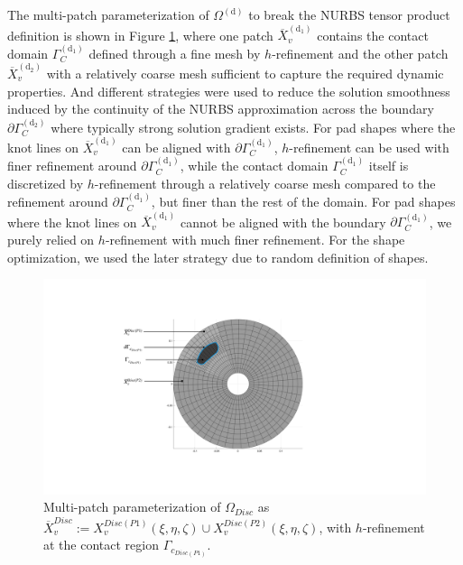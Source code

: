 The multi-patch parameterization of $\Omega^{(\mathrm d)}$ to break the NURBS tensor product definition is shown in Figure \ref{fig:multi-patch_disc}, where one patch  $\overline{X}_{v}^{(\mathrm d_1)}$ contains the contact domain $\Gamma_{C}^{(\mathrm d_1)}$ defined through a fine mesh by $h$-refinement and the other patch $\overline{X}_{v}^{(\mathrm d_2)}$ with a relatively coarse mesh sufficient to capture the required dynamic properties. And different strategies were used to reduce the solution smoothness induced by the continuity of the NURBS approximation across the boundary $\partial \Gamma_{C}^{(\mathrm d_2)}$ where typically strong solution gradient exists. For pad shapes where the knot lines on  $\overline{X}_{v}^{(\mathrm d_1)}$ can be aligned with $\partial\Gamma_{C}^{(\mathrm d_1)}$, $h$-refinement can be used with finer refinement around $\partial\Gamma_{C}^{(\mathrm d_1)}$, while the contact domain $\Gamma_{C}^{(\mathrm d_1)}$ itself is discretized by $h$-refinement through a relatively coarse mesh compared to the refinement around $\partial\Gamma_{C}^{(\mathrm d_1)}$, but finer than the rest of the domain. For pad shapes where the knot lines on $\overline{X}_{v}^{(\mathrm d_1)}$ cannot be aligned with the boundary $\partial\Gamma_{C}^{(\mathrm d_1)}$, we purely relied on $h$-refinement with much finer refinement. For the shape optimization, we used the later strategy due to random definition of shapes. \\


\begin{figure}[h!]
    \centering
    \includegraphics[scale=0.3]{Chapter5/Pictures/ran3.pdf}
    \caption{Multi-patch parameterization of $\Omega_{Disc}$ as $\overline{X}_{v}^{Disc}:=X_{v}^{Disc(P1)}(\xi,\eta,\zeta) \cup X_{v}^{Disc(P2)}(\xi,\eta,\zeta)$, with $h$-refinement at the contact region $\Gamma_{c_{Disc(P1)}}$.}
    \label{fig:multi-patch_disc}
\end{figure}

